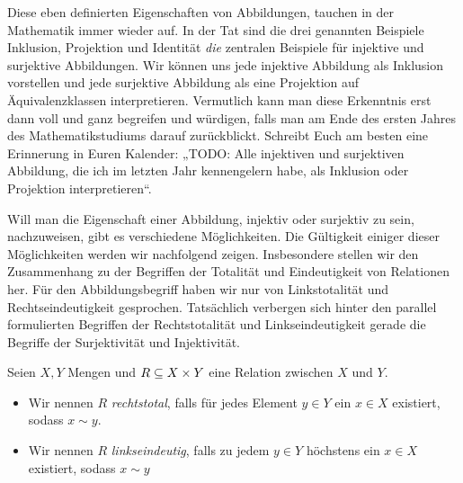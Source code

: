 
Diese eben definierten Eigenschaften von Abbildungen, tauchen in der Mathematik
immer wieder auf. In der Tat sind die drei genannten Beispiele Inklusion,
Projektion und Identität \emph{die} zentralen Beispiele für injektive und
surjektive Abbildungen. Wir können uns jede injektive Abbildung als Inklusion
vorstellen und jede surjektive Abbildung als eine Projektion auf
Äquivalenzklassen interpretieren. Vermutlich kann man diese Erkenntnis erst dann
voll und ganz begreifen und würdigen, falls man am Ende des ersten Jahres des
Mathematikstudiums darauf zurückblickt. Schreibt Euch am besten eine Erinnerung
in Euren Kalender: „TODO: Alle injektiven und surjektiven Abbildung, die ich im
letzten Jahr kennengelern habe, als Inklusion oder Projektion interpretieren“.

Will man die Eigenschaft einer Abbildung, injektiv oder surjektiv zu sein,
nachzuweisen, gibt es verschiedene Möglichkeiten. Die Gültigkeit einiger dieser
Möglichkeiten werden wir nachfolgend zeigen. Insbesondere stellen wir den
Zusammenhang zu der Begriffen der Totalität und Eindeutigkeit von Relationen
her. Für den Abbildungsbegriff haben wir nur von Linkstotalität und
Rechtseindeutigkeit gesprochen. Tatsächlich verbergen sich hinter den parallel
formulierten Begriffen der Rechtstotalität und Linkseindeutigkeit gerade die
Begriffe der Surjektivität und Injektivität.

\begin{defin}
  Seien $X,Y$ Mengen und $R \subseteq X\times Y$ eine Relation zwischen $X$ und $Y$.
  \begin{itemize}
  \item Wir nennen $R$ \emph{rechtstotal}, falls für jedes Element $y\in Y$ ein
    $x\in X$ existiert, sodass $x \sim y$.
  \item Wir nennen $R$ \emph{linkseindeutig}, falls zu jedem $y\in Y$ höchstens
    ein $x\in X$ existiert, sodass $x\sim y$
  \end{itemize}
\end{defin}


